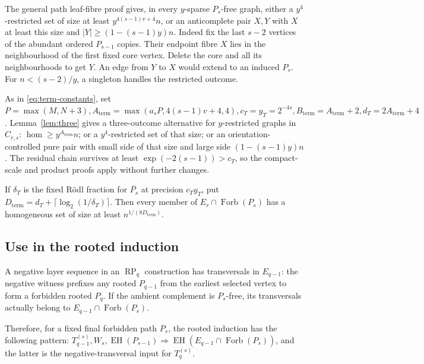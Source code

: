 \documentclass[11pt,a4paper]{article}
\theoremstyle{definition}
\theoremstyle{remark}
\numberwithin{equation}{section}
\begin{document}
The general path leaf-fibre proof gives, in every \(y\)-sparse \(P_{s}\)-free graph, either a \(y^{4}\)-restricted set of size at least \(y^{4(s-1)v+4}n\), or an anticomplete pair \(X,\allowbreak Y\) with \(X\) at least this size and \(|Y|\ge\allowbreak (1-(s-1)y)n\). Indeed fix the last \(s-2\) vertices of the abundant ordered \(P_{s-1}\) copies. Their endpoint fibre \(X\) lies in the neighbourhood of the first fixed core vertex. Delete the core and all its neighbourhoods to get \(Y\). An edge from \(Y\) to \(X\) would extend to an induced \(P_{s}\). For \(n<(s-2)/y\), a singleton handles the restricted outcome.

As in \eqref{eq:term-constants}, set \(P=\max (M,\allowbreak N+3),\allowbreak  A_{\mathrm{term}}=\max (a_{s} P,\allowbreak 4(s-1)v+4,\allowbreak 4),\allowbreak  c_{T}=y_{T}=2^{-4s},\allowbreak  B_{\mathrm{term}}=A_{\mathrm{term}}+2,\allowbreak  d_{T}=2A_{\mathrm{term}}+4\). Lemma~\ref{lem:three} gives a three-outcome alternative for \(y\)-restricted graphs in \(C_{r,\allowbreak s}\): \(\hom \ge\allowbreak y^{A_{\mathrm{term}}} n\); or a \(y^{4}\)-restricted set of that size; or an orientation-controlled pure pair with small side of that size and large side \((1-(s-1)y)n\). The residual chain survives at least \(\exp (-2(s-1))>c_{T}\), so the compact-scale and product proofs apply without further changes.

If \(\delta_{T}\) is the fixed R\"odl fraction for \(\overline{P_{s}}\) at precision \(c_{T}y_{T}\), put \(D_{\mathrm{term}}=d_{T}+\lceil \log _{2}(1/\delta_{T})\rceil\). Then every member of \(E_{r} \cap  \operatorname{Forb}(P_{s})\) has a homogeneous set of size at least \(n^{1/(8D_{\mathrm{term}})}\).


\subsection{Use in the rooted induction}\label{subsec:tail-induction}
A negative layer sequence in an \(\operatorname{RP}_{q}\) construction has transversals in \(E_{q-1}\): the negative witness prefixes any rooted \(P_{q-1}\) from the earliest selected vertex to form a forbidden rooted \(P_{q}\). If the ambient complement is \(P_{s}\)-free, its transversals actually belong to \(E_{q-1} \cap  \operatorname{Forb}(P_{s})\).

Therefore, for a fixed final forbidden path \(P_{s}\), the rooted induction has the following pattern: \(T_{q-1}^{(s)},\allowbreak  W_{s},\allowbreak  \operatorname{EH}(P_{s-1})\Longrightarrow\operatorname{EH}(E_{q-1} \cap  \operatorname{Forb}(P_{s}))\), and the latter is the negative-transversal input for \(T_{q}^{(s)}\).
\end{document}
